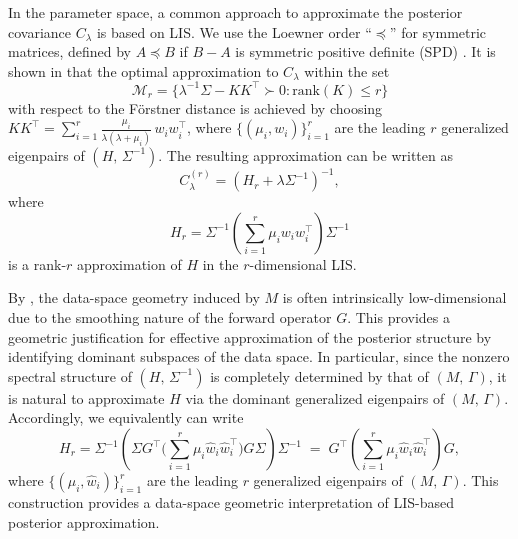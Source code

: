 \documentclass[]{myarticle}
\begin{document}
In the parameter space, a common approach to approximate the posterior covariance $C_{\lambda}$ is based on LIS. We use the Loewner order ``$\preceq$'' for symmetric matrices, defined by $A \preceq B$ if $B-A$ is symmetric positive definite (SPD) \cite{horn2012matrix}. It is shown in \cite{spantini2015optimal} that the optimal approximation to $C_{\lambda}$ within the set
\[\mathcal{M}_r = \{\lambda^{-1}\Sigma-KK^{\top} \succ 0 : \mathrm{rank}(K)\leq r\}\]
with respect to the F{\"o}rstner distance is achieved by choosing $KK^{\top}=\sum_{i=1}^{r}\frac{\mu_i}{\lambda(\lambda+\mu_i)}\, w_{i}w_{i}^{\top}$, where $\{(\mu_i,w_i)\}_{i=1}^{r}$ are the leading $r$ generalized eigenpairs of $(H,\,\Sigma^{-1})$. The resulting approximation can be written as
\begin{equation}\label{cov_LIS}
  C_{\lambda}^{(r)} = (H_{r}+\lambda\Sigma^{-1})^{-1},
\end{equation}
where
\[H_{r}=\Sigma^{-1}\left(\sum_{i=1}^{r}\mu_{i}w_{i}w_{i}^{\top}\right)\Sigma^{-1}\]
is a rank-$r$ approximation of $H$ in the $r$-dimensional LIS.

By , the data-space geometry induced by $M$ is often intrinsically low-dimensional due to the smoothing nature of the forward operator $G$. This provides a geometric justification for effective approximation of the posterior structure by identifying dominant subspaces of the data space. In particular, since the nonzero spectral structure of $(H,\,\Sigma^{-1})$ is completely determined by that of $(M,\,\Gamma)$, it is natural to approximate $H$ via the dominant generalized eigenpairs of $(M,\,\Gamma)$. Accordingly, we equivalently can write
\begin{equation}\label{Hk_1}
  H_{r}
  = \Sigma^{-1}\!\left(\Sigma G^{\top}
  \Big(\sum_{i=1}^{r}\mu_{i}\hat{w}_{i}\hat{w}_{i}^{\top}\Big)
  G\Sigma\right)\!\Sigma^{-1}
  \;=\;
  G^{\top}\!\left(\sum_{i=1}^{r}\mu_{i}\hat{w}_{i}\hat{w}_{i}^{\top}\right)\!G,
\end{equation}
where $\{(\mu_i,\hat{w}_i)\}_{i=1}^{r}$ are the leading $r$ generalized eigenpairs of $(M,\,\Gamma)$. This construction provides a data-space geometric interpretation of LIS-based posterior approximation.


\end{document}
